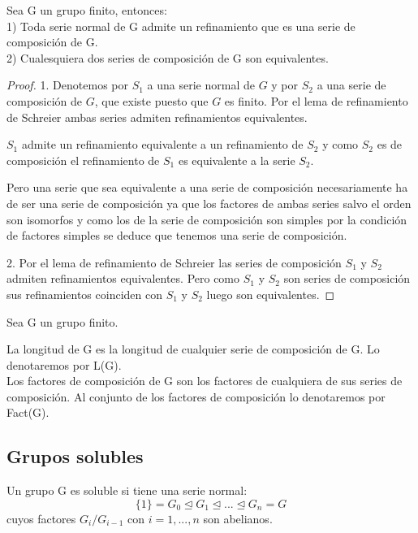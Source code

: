 \begin{nth}
Sea G un grupo finito, entonces:\\
1) Toda serie normal de G admite un refinamiento que es una serie de composición de G.\\
2) Cualesquiera dos series de composición de G son equivalentes.
\end{nth}
\begin{proof}
1. Denotemos por $S_1$ a una serie normal de $G$ y por $S_2$ a una serie de composición de $G$, que existe puesto que $G$ es finito. Por el lema de refinamiento de Schreier ambas series admiten refinamientos equivalentes. 

$S_1$ admite un refinamiento equivalente a un refinamiento de $S_2$ y como $S_2$ es de composición el refinamiento de $S_1$ es equivalente a la serie $S_2$.

Pero una serie que sea equivalente a una serie de composición necesariamente ha de ser una serie de composición ya que los factores de ambas series salvo el orden son isomorfos y como los de la serie de composición son simples por la condición de factores simples se deduce que tenemos una serie de composición.

2. Por el lema de refinamiento de Schreier las series de composición $S_1$ y $S_2$ admiten refinamientos equivalentes. Pero como $S_1$ y $S_2$ son series de composición sus refinamientos coinciden con $S_1$ y $S_2$ luego son equivalentes.
\end{proof}

\begin{ndef}
Sea G un grupo finito.

La longitud de G es la longitud de cualquier serie de composición de G. Lo denotaremos por L(G).\\
Los factores de composición de G son los factores de cualquiera de sus series de composición. Al conjunto de los factores de composición lo denotaremos por Fact(G).
\end{ndef}

\subsection{Grupos solubles}

\begin{ndef}
Un grupo G es soluble si tiene una serie normal: $$\{1\} = G_0 \trianglelefteq G_1 \trianglelefteq ... \trianglelefteq G_n = G$$ cuyos factores $G_i/G_{i-1}$ con $i=1,...,n$ son abelianos.
\end{ndef}

